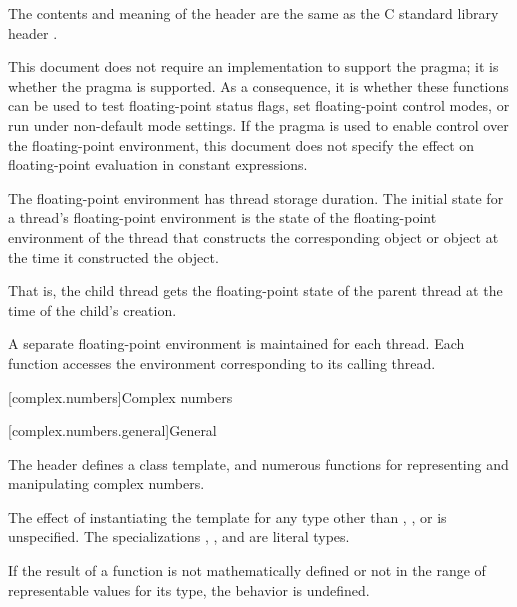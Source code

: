 \pnum
The contents and meaning of the header 
are the same as the C standard library header .
\begin{note}
This document does not require an implementation to support the
 pragma;
it is 
whether the pragma is supported. As a consequence,
it is 
whether these functions can be used to test floating-point status flags,
set floating-point control modes, or run under non-default mode settings.
If the pragma is used to enable control over the floating-point environment,
this document does not specify the effect on
floating-point evaluation in constant expressions.
\end{note}

\pnum
The floating-point environment has thread storage
duration. The initial state for a thread's floating-point
environment is the state of the floating-point environment of the thread that constructs
the corresponding  object
or  object
at the time it
constructed the object.
\begin{note}
That is, the child thread gets the floating-point
state of the parent thread at the time of the child's creation.
\end{note}

\pnum
A separate floating-point environment is maintained for each thread. Each function
accesses the environment corresponding to its calling thread.


[complex.numbers]{Complex numbers}

[complex.numbers.general]{General}

\pnum
The header  defines a class template,
and numerous functions for representing and manipulating complex numbers.

\pnum
The effect of instantiating the template
for any type other than , , or  is unspecified.
The specializations
,
, and
 are literal types.

\pnum
If the result of a function is not mathematically defined or not in
the range of representable values for its type, the behavior is
undefined.

